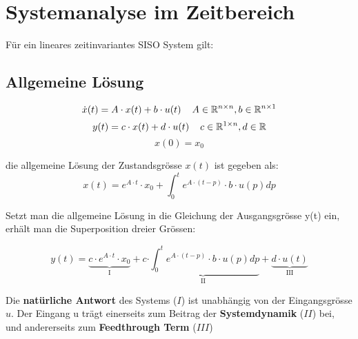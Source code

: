 \vfill\null\columnbreak
\section{Systemanalyse im Zeitbereich}
Für ein lineares zeitinvariantes SISO System gilt:
    \subsection{Allgemeine Lösung}
        \[ \dot{x}(t) = A \cdot x(t) + b \cdot u(t) \hspace{4mm} A \in\mathbb{R}^{n \times n}, b \in\mathbb{R}^{n \times 1} \]
        \[ y(t) = c \cdot x(t) + d \cdot u(t) \hspace{4mm} c \in\mathbb{R}^{1 \times n}, d \in\mathbb{R}\]
        \[x(0) = x_0\]
        
        die allgemeine Lösung der Zustandsgrösse $x(t)$ ist gegeben als: 
        \[ x(t) = e^{A\cdot t} \cdot x_0 + \int_0^t e^{A\cdot(t-p)}\cdot b \cdot u(p)dp\]
        
        Setzt man die allgemeine Lösung in die Gleichung der Ausgangsgrösse y(t) ein, erhält man die Superposition dreier Grössen:
        
         \[ y(t) = \underbrace{c\cdot e^{A\cdot t} \cdot x_0}_\text{I} + c \underbrace{\cdot \int_0^t e^{A\cdot(t-p)}\cdot b \cdot u(p)dp}_\text{II} + \underbrace{d\cdot u(t)}_\text{III}\]
         
         Die \textbf{natürliche Antwort} des Systems ($I$) ist unabhängig von der Eingangsgrösse $u$. Der Eingang u trägt einerseits zum Beitrag der \textbf{Systemdynamik} ($II$) bei, und andererseits zum \textbf{Feedthrough Term} ($III$)
